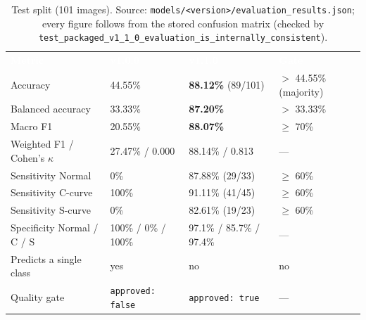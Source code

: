 \documentclass[12pt,a4paper]{article}
\newcommand{\fp}[1]{\nolinkurl{#1}}
\newcommand{\hd}[1]{\textcolor{white}{\textbf{#1}}}
\begin{document}
\begin{table}[H]
\centering
\caption{Test split (101 images). Source: \fp{models/<version>/evaluation_results.json}; every figure follows from the stored confusion matrix (checked by \texttt{test\_packaged\_v1\_1\_0\_evaluation\_is\_internally\_consistent}).}
\label{tab:metrics}
\renewcommand{\arraystretch}{1.3}
\begin{tabularx}{\textwidth}{Y C{2.5cm} C{2.5cm} C{2.5cm}}
\hd{Metric} & \hd{v1.0.0} & \hd{v1.1.0} & \hd{Gate} \\
Accuracy & 44.55\% & \textbf{88.12\%} (89/101) & $>$ 44.55\% (majority) \\
Balanced accuracy & 33.33\% & \textbf{87.20\%} & $>$ 33.33\% \\
Macro F1 & 20.55\% & \textbf{88.07\%} & $\geq$ 70\% \\
Weighted F1 / Cohen's $\kappa$ & 27.47\% / 0.000 & 88.14\% / 0.813 & --- \\
Sensitivity Normal & 0\% & 87.88\% (29/33) & $\geq$ 60\% \\
Sensitivity C-curve & 100\% & 91.11\% (41/45) & $\geq$ 60\% \\
Sensitivity S-curve & 0\% & 82.61\% (19/23) & $\geq$ 60\% \\
Specificity Normal / C / S & 100\% / 0\% / 100\% & 97.1\% / 85.7\% / 97.4\% & --- \\
Predicts a single class & yes & no & no \\
Quality gate & \texttt{approved: false} & \texttt{approved: true} & --- \\
\end{tabularx}
\end{table}
\end{document}
